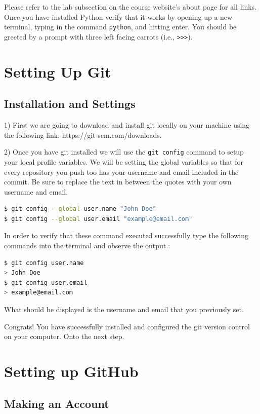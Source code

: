 \documentclass[a4paper,10pt]{article} %
\begin{document}
Please refer to the lab subsection on the course website's about page for all
links. Once you have installed Python verify that it works by opening up a new terminal, typing in the command \lstinline|python|, and hitting enter. You should be greeted by a prompt with three left facing carrots (i.e., \lstinline|>>>|).

\section{Setting Up Git}

\subsection{Installation and Settings}

1) First we are going to download and install git locally on your machine using the following link: https://git-scm.com/downloads.

2) Once you have git installed we will use the \lstinline|git config| command to setup your local profile variables. We will be setting the global variables so that for every repository you push too has your username and email included in the commit. Be sure to replace the text in between the quotes with your own username and email.

\begin{lstlisting}[language=bash]
$ git config --global user.name "John Doe"
$ git config --global user.email "example@email.com"
\end{lstlisting}

In order to verify that these command executed successfully type the following commands into the terminal and observe the output.:
\begin{lstlisting}[language=bash]
$ git config user.name
> John Doe
$ git config user.email
> example@email.com
\end{lstlisting}
What should be displayed is the username and email that you previously set.

Congrats! You have successfully installed and configured the git version control on your computer. Onto the next step.

\section{Setting up GitHub}

\subsection{Making an Account}
\end{document}
